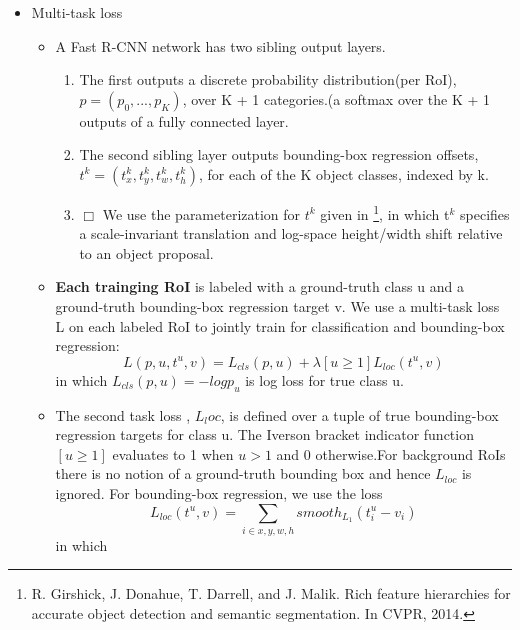 \documentclass[11pt]{article}
\begin{document}
\begin{itemize}

\item Multi-task loss\\
\label{sec-1-1-3-1}%
\begin{itemize}
\item A Fast R-CNN network has two sibling output layers.
\begin{enumerate}
\item The first outputs a discrete probability distribution(per RoI), 
          $p = (p_0, ..., p_K)$, over K + 1 categories.(a softmax over the K + 1 outputs of a
          fully connected layer.
\item The second sibling layer outputs bounding-box regression offsets, 
          $t^k = (t_x^k, t_y^k, t_w^k, t_h^k)$, for each of the K object classes, indexed by k.
\item $\Box$ We use the parameterization for $t^k$ given in \footnote{R. Girshick, J. Donahue, T. Darrell, and J. Malik.  
  Rich feature hierarchies for accurate object detection and semantic segmentation. In CVPR, 2014.
 }, in which t$^k$ specifies a
          scale-invariant translation and log-space height/width shift relative to an object 
          proposal.
\end{enumerate}
\item \textbf{Each trainging RoI} is labeled with a ground-truth class u and a ground-truth bounding-box
       regression target v. We use a multi-task loss L on each labeled RoI to jointly train for
       classification and bounding-box regression:
       \begin{equation}
         L(p, u, t^u, v) = L_{cls}(p, u) + \lambda[u\ge1]L_{loc}(t^u, v)         
       \end{equation}
       in which $L_{cls}(p, u)  = -logp_u$ is log loss for true class u.
\item The second task loss , $L_loc$, is defined over a tuple of true bounding-box regression 
       targets for class u. The Iverson bracket indicator function $[u\ge1]$ evaluates to 1 when 
       $u>1$ and 0 otherwise.For background RoIs there is no notion of a ground-truth bounding box
       and hence $L_{loc}$ is ignored. For bounding-box regression, we use the loss
       \begin{equation}
         L_{loc}(t^u, v) = \sum_{i\in{x, y, w, h}} smooth_{L_1}(t_i^u - v_i)         
       \end{equation}
       in which 
       \begin{equation}

\end{equation}
\end{itemize}
\end{itemize}
\end{document}
